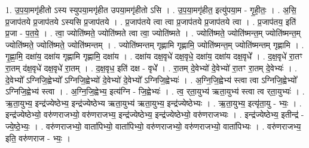 \documentclass[17pt]{extarticle}
\begin{document}
1. उ॒प॒या॒मगृ॑हीतो ऽस्य स्युपया॒मगृ॑हीत उपया॒मगृ॑हीतो ऽसि । . उ॒प॒या॒मगृ॑हीत॒ इत्यु॑पया॒म - गृ॒ही॒तः॒ । . अ॒सि॒ प्र॒जाप॑तये प्र॒जाप॑तये ऽस्यसि प्र॒जाप॑तये । . प्र॒जाप॑तये त्वा त्वा प्र॒जाप॑तये प्र॒जाप॑तये त्वा । . प्र॒जाप॑तय॒ इति॑ प्र॒जा - प॒त॒ये॒ । . त्वा॒ ज्योति॑ष्मते॒ ज्योति॑ष्मते त्वा त्वा॒ ज्योति॑ष्मते । . ज्योति॑ष्मते॒ ज्योति॑ष्मन्त॒म् ज्योति॑ष्मन्त॒म् ज्योति॑ष्मते॒ ज्योति॑ष्मते॒ ज्योति॑ष्मन्तम् । . ज्योति॑ष्मन्तम् गृह्णामि गृह्णामि॒ ज्योति॑ष्मन्त॒म् ज्योति॑ष्मन्तम् गृह्णामि । . गृ॒ह्णा॒मि॒ दक्षा॑य॒ दक्षा॑य गृह्णामि गृह्णामि॒ दक्षा॑य । . दक्षा॑य दक्ष॒वृधे॑ दक्ष॒वृधे॒ दक्षा॑य॒ दक्षा॑य दक्ष॒वृधे᳚ । . द॒क्ष॒वृधे॑ रा॒तꣳ रा॒तम् द॑क्ष॒वृधे॑ दक्ष॒वृधे॑ रा॒तम् । . द॒क्ष॒वृध॒ इति॑ दक्ष - वृधे᳚ । . रा॒तम् दे॒वेभ्यो॑ दे॒वेभ्यो॑ रा॒तꣳ रा॒तम् दे॒वेभ्यः॑ । . दे॒वेभ्यो᳚ ऽग्निजि॒ह्वेभ्यो᳚ ऽग्निजि॒ह्वेभ्यो॑ दे॒वेभ्यो॑ दे॒वेभ्यो᳚ ऽग्निजि॒ह्वेभ्यः॑ । . अ॒ग्नि॒जि॒ह्वेभ्य॑ स्त्वा त्वा ऽग्निजि॒ह्वेभ्यो᳚ ऽग्निजि॒ह्वेभ्य॑ स्त्वा । . अ॒ग्नि॒जि॒ह्वेभ्य॒ इत्य॑ग्नि - जि॒ह्वेभ्यः॑ । . त्व॒ र्‌ता॒युभ्य॑ ऋता॒युभ्य॑ स्त्वा त्व र्‌ता॒युभ्यः॑ । . ऋ॒ता॒युभ्य॒ इन्द्र॑ज्येष्ठेभ्य॒ इन्द्र॑ज्येष्ठेभ्य ऋता॒युभ्य॑ ऋता॒युभ्य॒ इन्द्र॑ज्येष्ठेभ्यः । . ऋ॒ता॒युभ्य॒ इत्यृ॑ता॒यु - भ्यः॒ । . इन्द्र॑ज्येष्ठेभ्यो॒ वरु॑णराजभ्यो॒ वरु॑णराजभ्य॒ इन्द्र॑ज्येष्ठेभ्य॒ इन्द्र॑ज्येष्ठेभ्यो॒ वरु॑णराजभ्यः । . इन्द्र॑ज्येष्ठेभ्य॒ इतीन्द्र॑ - ज्ये॒ष्ठे॒भ्यः॒ । . वरु॑णराजभ्यो॒ वाता॑पिभ्यो॒ वाता॑पिभ्यो॒ वरु॑णराजभ्यो॒ वरु॑णराजभ्यो॒ वाता॑पिभ्यः । . वरु॑णराजभ्य॒ इति॒ वरु॑णराज - भ्यः॒ । \newline
\end{document}
